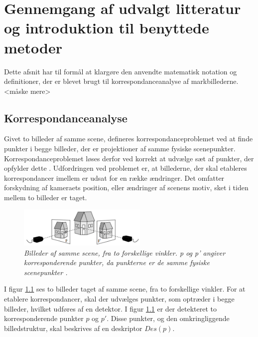 \chapter{Gennemgang af udvalgt litteratur og introduktion til benyttede metoder} \label{sec:Kor}
Dette afsnit har til formål at klargøre den anvendte matematisk notation og definitioner, der er blevet brugt til korrespondanceanalyse af markbillederne.<måske mere>

\section{Korrespondanceanalyse}
Givet to billeder af samme scene, defineres korrespondanceproblemet ved at finde punkter i begge billeder, der er projektioner af samme fysiske scenepunkter. Korrespondanceproblemet løses derfor ved korrekt at udvælge sæt af punkter, der opfylder dette \cite{Stefano}.  Udfordringen ved problemet er, at billederne, der skal etableres korrespondancer imellem er udsat for en række ændringer. Det omfatter forskydning af kameraets position, eller ændringer af scenens motiv, sket i tiden mellem to billeder er taget. 
\begin{figure}[H]
    \centering
    \includegraphics[width=0.55\textwidth]{fig/3.png}
     \vspace{-1em}
    \begin{center}    
       \caption{{\footnotesize \textit{Billeder af samme scene, fra to forskellige vinkler. p og p' angiver korresponderende punkter, da punkterne er de samme fysiske scenepunkter \cite{kim}.}}}
    \label{fig:1}
     \end{center}
     \vspace{-2.5em}
  \end{figure} \noindent
I figur \ref{fig:1} ses to billeder taget af samme scene, fra to forskellige vinkler. For at etablere korrespondancer, skal der udvælges punkter, som optræder i begge billeder, hvilket udføres af en detektor. I figur \ref{fig:1} er der detekteret to korresponderende punkter $p$ og $p'$. Disse punkter, og den omkringliggende billedstruktur, skal beskrives af en deskriptor $Des(p)$. %
